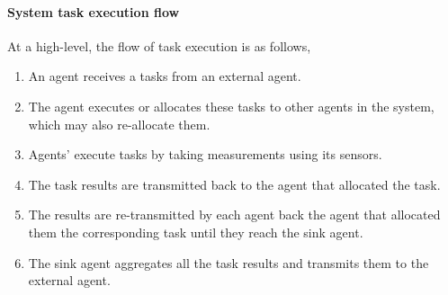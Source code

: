 \paragraph{System task execution flow}

At a high-level, the flow of task execution is as follows,
\begin{enumerate}
	\item An agent receives a tasks from an external agent.
	\item The agent executes or allocates these tasks to other agents in the system, which may also re-allocate them.
	\item Agents' execute tasks by taking measurements using its sensors.
	\item The task results are transmitted back to the agent that allocated the task.
	\item The results are re-transmitted by each agent back the agent that allocated them the corresponding task until they reach the sink agent.
	\item The sink agent aggregates all the task results and transmits them to the external agent.
\end{enumerate}


